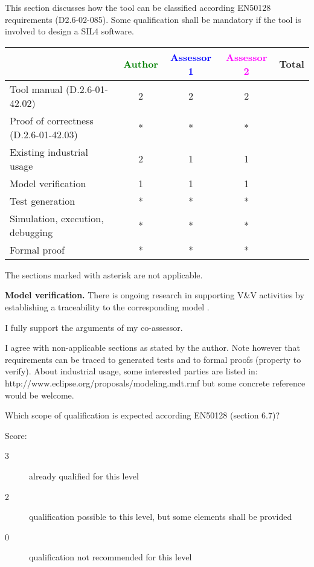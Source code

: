 This section discusses how the tool can be classified according EN50128 requirements (D2.6-02-085). Some qualification shall be mandatory  if the tool is involved to design a SIL4 software.


\begin{tabular}{|l | c | c | c | c|}
\hline
& \textcolor{green}{Author} & \textcolor{blue}{Assessor 1} & \textcolor{magenta}{Assessor 2} & Total \\
\hline
Tool manual (D.2.6-01-42.02) & 2 & 2 & 2 &  \\
\hline
Proof of correctness (D.2.6-01-42.03) & * & * & * & \\
\hline
Existing industrial  usage  & 2 & 1 & 1 & \\
\hline
Model verification & 1 & 1 & 1 & \\
\hline
Test generation & * & * & * & \\
\hline
Simulation, execution, debugging & * & * & * & \\
\hline
Formal proof & * & * & * & \\
\hline
\end{tabular}

\begin{author_comment}
The sections marked with asterisk are not applicable.

\textbf{Model verification.} There is ongoing research in supporting V\&V activities by establishing a traceability to the corresponding model \cite {HalJasLad2013}.

\end{author_comment}

\begin{assessor1}
I fully support the arguments of my co-assessor.
\end{assessor1}

\begin{assessor2}
I agree with non-applicable sections as stated by the author. Note however that requirements can be traced to generated tests and to formal proofs (property to verify). About industrial usage, some interested parties are listed in: http://www.eclipse.org/proposals/modeling.mdt.rmf but some concrete reference would be welcome.
\end{assessor2}

Which scope of qualification is expected according EN50128 (section 6.7)?

Score:
\begin{description}
\item[3] already qualified for this level
\item[2] qualification possible to this level, but some elements shall be provided
\item[0] qualification not recommended for this level
\end{description}


